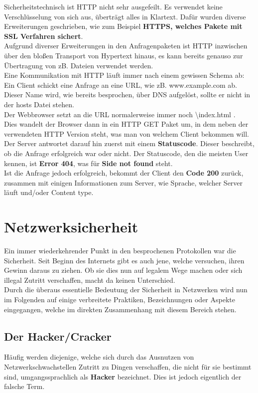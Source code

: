 \documentclass[12pt,a4paper]{report}
\begin{document}
Sicherheitstechnisch ist HTTP nicht sehr ausgefeilt. Es verwendet keine Verschlüsselung von sich aus, überträgt alles in Klartext. Dafür wurden diverse Erweiterungen geschrieben, wie zum Beispiel \textbf{HTTPS, welches Pakete mit SSL Verfahren sichert}.\\

Aufgrund diverser Erweiterungen in den Anfragenpaketen ist HTTP inzwischen über den bloßen Transport von Hypertext hinaus, es kann bereits genauso zur Übertragung von zB. Dateien verwendet werden.\\

Eine Kommunikation mit HTTP läuft immer nach einem gewissen Schema ab:\\
Ein Client schickt eine Anfrage an eine URL, wie zB. www.example.com ab. Dieser Name wird, wie bereits besprochen, über DNS aufgelöst, sollte er nicht in der hosts Datei stehen.\\
Der Webbrowser setzt an die URL normalerweise immer noch \glqq \textbackslash index.html \grqq .\\
Dies wandelt der Browser dann in ein HTTP GET Paket um, in dem neben der verwendeten HTTP Version steht, was man von welchem Client bekommen will.\\
Der Server antwortet darauf hin zuerst mit einem \textbf{Statuscode}. Dieser beschreibt, ob die Anfrage erfolgreich war oder nicht. Der Statuscode, den die meisten User kennen, ist \textbf{Error 404}, was für \textbf{Side not found} steht.\\
Ist die Anfrage jedoch erfolgreich, bekommt der Client den \textbf{Code 200} zurück, zusammen mit einigen Informationen zum Server, wie Sprache, welcher Server läuft und/oder Content type.
\section{Netzwerksicherheit}\label{sec:security}
Ein immer wiederkehrender Punkt in den besprochenen Protokollen war die Sicherheit. Seit Beginn des Internets gibt es auch jene, welche versuchen, ihren Gewinn daraus zu ziehen. Ob sie dies nun auf legalem Wege machen oder sich illegal Zutritt verschaffen, macht da keinen Unterschied.\\

Durch die überaus essentielle Bedeutung der Sicherheit in Netzwerken wird nun im Folgenden auf einige verbreitete Praktiken, Bezeichnungen oder Aspekte eingegangen, welche im direkten Zusammenhang mit diesem Bereich stehen.
\subsection{Der Hacker/Cracker}
Häufig werden diejenige, welche sich durch das Ausnutzen von Netzwerkschwachstellen Zutritt zu Dingen verschaffen, die nicht für sie bestimmt sind, umgangssprachlich als \textbf{Hacker} bezeichnet. Dies ist jedoch eigentlich der falsche Term.\\
\end{document}
